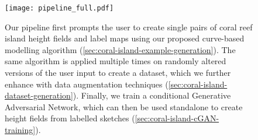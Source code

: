 \begin{figure}[H]
    \texttt{[image: pipeline\_full.pdf]}
    \caption{Our pipeline first prompts the user to create single pairs of coral reef island height fields and label maps using our proposed curve-based modelling algorithm (\cref{sec:coral-island-example-generation}). The same algorithm is applied multiple times on randomly altered versions of the user input to create a dataset, which we further enhance with data augmentation techniques (\cref{sec:coral-island-dataset-generation}). Finally, we train a conditional Generative Adversarial Network, which can then be used standalone to create height fields from labelled sketches (\cref{sec:coral-island-cGAN-training}).}
    \label{fig:coral-island-pipeline}
\end{figure}












